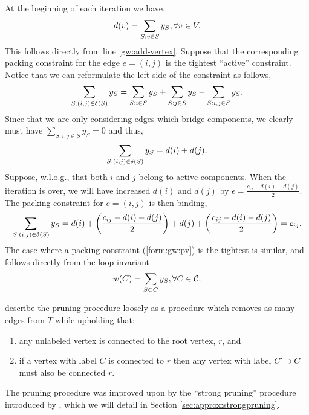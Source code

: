  At the beginning of each iteration we have,
 $$d(v) = \sum_{S: v \in S} y_S, \forall v \in V \mathnormal{.}$$
 This follows directly from line \ref{gw:add-vertex}. Suppose that the corresponding
 packing constraint for the edge $e = (i,j)$ is
  the tightest ``active'' constraint. Notice that we can reformulate the left side of the constraint as follows,
 $$\sum_{S: (i,j) \in \delta(S)} y_S = \sum_{S : i \in S} y_S + \sum_{S : j \in S} y_S - \sum_{S : i,j \in S} y_S\mathnormal{.}$$
 Since that we are only considering edges which bridge components, we clearly must have $\sum_{S : i,j \in S} y_S = 0$
 and thus,
 $$\sum_{S: (i,j) \in \delta(S)} y_S = d(i) + d(j)\mathnormal{.}$$
 Suppose, w.l.o.g., that both $i$ and $j$ belong to active components.
 When the iteration is over, we will have increased $d(i)$ and $d(j)$ by $\epsilon = \frac{c_{ij} - d(i) - d(j)}{2}$.
 The packing constraint for $e = (i,j)$ is then binding,
 $$\sum_{S: (i,j) \in \delta(S)} y_S = d(i) + \left( \frac{c_{ij} - d(i) - d(j)}{2} \right) + d(j) +
 \left( \frac{c_{ij} - d(i) - d(j)}{2} \right)   = c_{ij}\mathnormal{.}$$
 The case where a packing constraint (\ref{form:gw:pv}) is the tightest is similar, and follows directly from the loop
 invariant
 $$w(C) = \sum_{S \subset C} y_S, \forall C \in \mathcal{C}\mathnormal{.}$$

 \cite{goemans1995general} describe the pruning procedure loosely as a procedure which removes as many
 edges from $T$ while upholding that:
 \begin{enumerate}
 \item any unlabeled vertex is connected to the root vertex, $r$, and
 \item if a vertex with label $C$ is connected to $r$ then any vertex with
   label $C' \supset C$ must also be connected $r$.
 \end{enumerate}
 The pruning procedure was improved upon by the ``strong pruning'' procedure introduced by \cite{Johnson:2000:PCS:338219.338637},
  which we will detail in Section \ref{sec:approx:strongpruning}.
